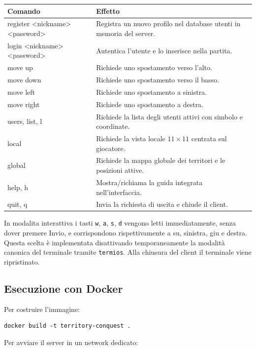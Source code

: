 \documentclass[11pt,a4paper]{article}
\begin{document}
\begin{center}
\begin{tabular}{>{\ttfamily}p{5.2cm}p{8.5cm}}
\toprule
\normalfont\textbf{Comando} & \textbf{Effetto} \\
\midrule
register <nickname> <password> & Registra un nuovo profilo nel database utenti in memoria del server. \\
login <nickname> <password> & Autentica l'utente e lo inserisce nella partita. \\
move up & Richiede uno spostamento verso l'alto. \\
move down & Richiede uno spostamento verso il basso. \\
move left & Richiede uno spostamento a sinistra. \\
move right & Richiede uno spostamento a destra. \\
users, list, l & Richiede la lista degli utenti attivi con simbolo e coordinate. \\
local & Richiede la vista locale \(11 \times 11\) centrata sul giocatore. \\
global & Richiede la mappa globale dei territori e le posizioni attive. \\
help, h & Mostra/richiama la guida integrata nell'interfaccia. \\
quit, q & Invia la richiesta di uscita e chiude il client. \\
\bottomrule
\end{tabular}
\end{center}

In modalita interattiva i tasti \texttt{w}, \texttt{a}, \texttt{s}, \texttt{d} vengono letti immediatamente, senza dover premere Invio, e corrispondono rispettivamente a su, sinistra, giu e destra. Questa scelta è implementata disattivando temporaneamente la modalità canonica del terminale tramite \texttt{termios}. Alla chiusura del client il terminale viene ripristinato.

\subsection{Esecuzione con Docker}

Per costruire l'immagine:

\begin{lstlisting}[style=textstyle]
docker build -t territory-conquest .
\end{lstlisting}

Per avviare il server in un network dedicato:
\end{document}
